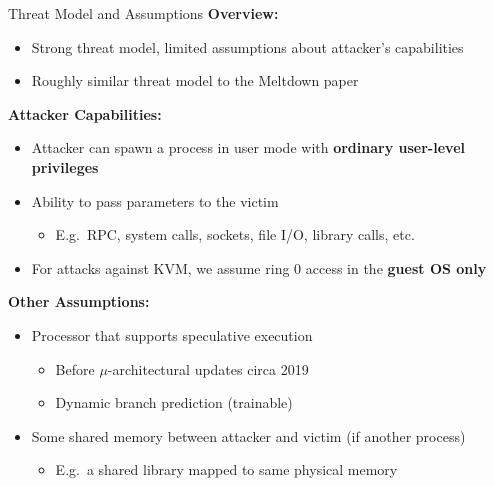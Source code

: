 \documentclass[10pt, dvipsnames, aspectratio=169]{beamer}
\begin{document}
\begin{frame}[c]{Threat Model and Assumptions}{}
  {\bf Overview:}
  \begin{itemize}
    \item Strong threat model, limited assumptions about attacker's capabilities
    \item Roughly similar threat model to the Meltdown paper
  \end{itemize}

  \vfill
  {\bf Attacker Capabilities:}
  \begin{itemize}
    \item Attacker can spawn a process in user mode with {\bf ordinary user-level privileges}
    \item Ability to pass parameters to the victim
    \begin{itemize}
      \item E.g.~RPC, system calls, sockets, file I/O, library calls, etc.
    \end{itemize}
    \item For attacks against KVM, we assume ring 0 access in the {\bf guest OS only}
  \end{itemize}

  \vfill
  {\bf Other Assumptions:}
  \begin{itemize}
    \item Processor that supports speculative execution
    \begin{itemize}
      \item Before $\mu$-architectural updates circa 2019
      \item Dynamic branch prediction (trainable)
    \end{itemize}
    \item Some shared memory between attacker and victim (if another process)
    \begin{itemize}
      \item E.g.~a shared library mapped to same physical memory
    \end{itemize}
  \end{itemize}
\end{frame}

\end{document}
